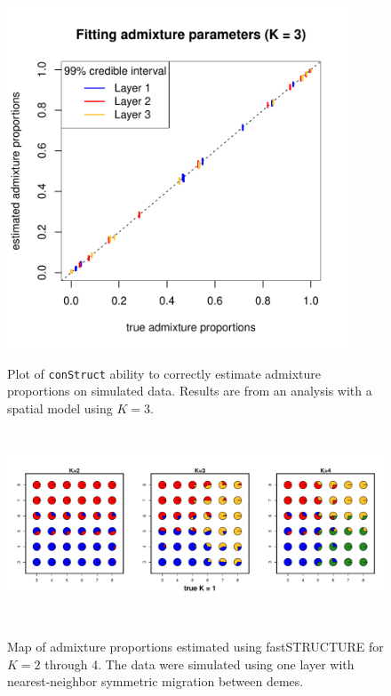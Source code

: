 \documentclass[12pt]{article}
\begin{document}
\begin{figure}
	\centering
		{\includegraphics[width=4in,height=4in]{figs/sims/simK3_adprop_fit.pdf}}
		\caption{
			Plot of \texttt{conStruct} ability to correctly estimate admixture proportions on simulated data.
			Results are from an analysis with a spatial model using $K=3$.
		}\label{simK3_adprop_fit}
\end{figure}

\begin{figure}
	\centering
		{\includegraphics[width=6in,height=2.25in]{figs/fastStr/fastStr_simK1_pies.pdf}}
	\caption{
	Map of admixture proportions estimated using fastSTRUCTURE \citep{fastStructure} for $K=2$ through 4.
	The data were simulated using one layer with nearest-neighbor symmetric migration between demes.
    }\label{fastStr_simK1}
\end{figure}
\end{document}
